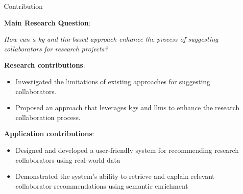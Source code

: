 \begin{tframe}{Contribution}

    \textbf{Main Research Question}:
    \begin{center}
        \textit{How can a \gls{kg} and \gls{llm}-based approach enhance the process of suggesting collaborators for research projects?}
    \end{center}

    \textbf{Research contributions}:
        \begin{itemize}
            \item Investigated the limitations of existing approaches for suggesting collaborators.
            \item Proposed an approach that leverages \glspl{kg} and \glspl{llm} to enhance the research collaboration process.
        \end{itemize}

        \vspace{0.2cm}

    \textbf{Application contributions}:
        \begin{itemize}
            \item Designed and developed a user-friendly system for recommending research collaborators using real-world data
            \item Demonstrated the system's ability to retrieve and explain relevant collaborator recommendations using semantic enrichment
        \end{itemize}
\end{tframe}